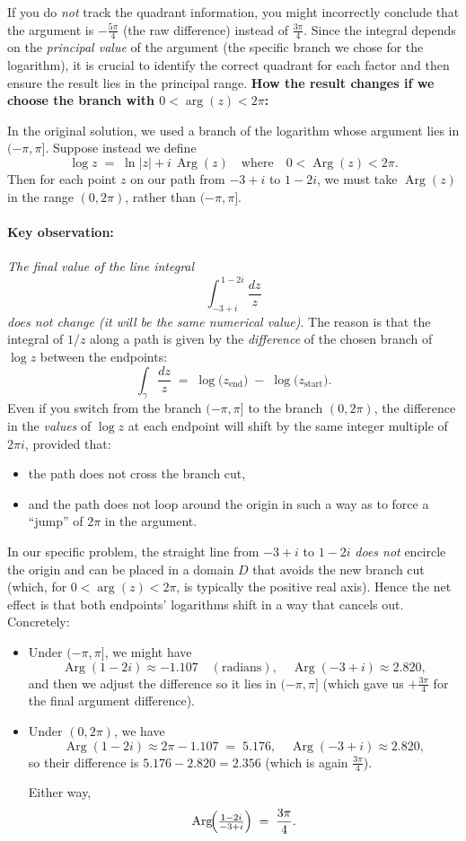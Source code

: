 \documentclass[12pt]{article}
\DeclareMathOperator{\Arg}{Arg}
\theoremstyle{definition} %
\theoremstyle{plain} %
\begin{document}
If you do \emph{not} track the quadrant information, you might incorrectly conclude that the argument is \(-\frac{5\pi}{4}\) (the raw difference) instead of \(\frac{3\pi}{4}\).  Since the integral depends on the \emph{principal value} of the argument (the specific branch we chose for the logarithm), it is crucial to identify the correct quadrant for each factor and then ensure the result lies in the principal range.
\textbf{How the result changes if we choose the branch with $0 < \arg(z) < 2\pi$:}

In the original solution, we used a branch of the logarithm whose argument lies in $(-\pi,\pi]$.  Suppose instead we define
\[
\log z \;=\; \ln|z| + i\,\Arg(z)
\quad\text{where}\quad
0 < \Arg(z) < 2\pi.
\]
Then for each point $z$ on our path from $-3 + i$ to $1 - 2i$, we must take $\Arg(z)$ in the range $(0,2\pi)$, rather than $(-\pi,\pi]$.

\paragraph{Key observation:}
\emph{The final value of the line integral}
\[
\int_{-3 + i}^{\,1 - 2i} \frac{dz}{z}
\]
\emph{does not change (it will be the same numerical value)}.  The reason is that the integral of $1/z$ along a path is given by the \emph{difference} of the chosen branch of $\log z$ between the endpoints:
\[
\int_{\gamma}\frac{dz}{z}
\;=\;
\log\bigl(z_{\text{end}}\bigr)
\;-\;
\log\bigl(z_{\text{start}}\bigr).
\]
Even if you switch from the branch $(-\pi,\pi]$ to the branch $(0,2\pi)$, the difference in the \emph{values} of $\log z$ at each endpoint will shift by the same integer multiple of $2\pi i$, provided that:

\begin{itemize}
\item the path does not cross the branch cut,
\item and the path does not loop around the origin in such a way as to force a ``jump'' of $2\pi$ in the argument.
\end{itemize}

In our specific problem, the straight line from $-3+i$ to $1-2i$ \emph{does not} encircle the origin and can be placed in a domain $D$ that avoids the new branch cut (which, for $0<\arg(z)<2\pi$, is typically the positive real axis).  Hence the net effect is that both endpoints' logarithms shift in a way that cancels out.  Concretely:

\begin{itemize}
\item Under $(-\pi,\pi]$, we might have 
\[
\Arg(1 - 2i)\approx -1.107 \quad(\text{radians}), 
\quad
\Arg(-3 + i)\approx 2.820,
\]
and then we adjust the difference so it lies in $(-\pi,\pi]$ (which gave us $+\frac{3\pi}{4}$ for the final argument difference).

\item Under $(0,2\pi)$, we have
\[
\Arg(1 - 2i) \approx 2\pi - 1.107 \;=\; 5.176,
\quad
\Arg(-3 + i)\approx 2.820,
\]
so their difference is $5.176 - 2.820 = 2.356$ (which is again $\tfrac{3\pi}{4}$).  

Either way, 
\[
\Arg\!\Bigl(\tfrac{1-2i}{-3+i}\Bigr) \;=\;\frac{3\pi}{4}.
\]
\end{itemize}
\end{document}
